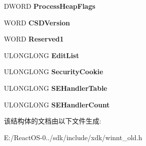 \begin{DoxyCompactItemize}
D\+W\+O\+RD {\bfseries Process\+Heap\+Flags}
\item 
\mbox{\label{struct___i_m_a_g_e___l_o_a_d___c_o_n_f_i_g___d_i_r_e_c_t_o_r_y64_ab2f2a1ae5634a9ab27dd1544e0cfab0a}} 
W\+O\+RD {\bfseries C\+S\+D\+Version}
\item 
\mbox{\label{struct___i_m_a_g_e___l_o_a_d___c_o_n_f_i_g___d_i_r_e_c_t_o_r_y64_a5f8e883e022c6456c50e85e4869b561d}} 
W\+O\+RD {\bfseries Reserved1}
\item 
\mbox{\label{struct___i_m_a_g_e___l_o_a_d___c_o_n_f_i_g___d_i_r_e_c_t_o_r_y64_aabdb79e093c3b752a6f121eebcfbf79e}} 
U\+L\+O\+N\+G\+L\+O\+NG {\bfseries Edit\+List}
\item 
\mbox{\label{struct___i_m_a_g_e___l_o_a_d___c_o_n_f_i_g___d_i_r_e_c_t_o_r_y64_af6728e60cbf4a1d734bd12d6b1585115}} 
U\+L\+O\+N\+G\+L\+O\+NG {\bfseries Security\+Cookie}
\item 
\mbox{\label{struct___i_m_a_g_e___l_o_a_d___c_o_n_f_i_g___d_i_r_e_c_t_o_r_y64_a5ab4a17df718998c22cb3a521fd15ba9}} 
U\+L\+O\+N\+G\+L\+O\+NG {\bfseries S\+E\+Handler\+Table}
\item 
\mbox{\label{struct___i_m_a_g_e___l_o_a_d___c_o_n_f_i_g___d_i_r_e_c_t_o_r_y64_a8bbbaf6612ac1e96310e816df684a1a2}} 
U\+L\+O\+N\+G\+L\+O\+NG {\bfseries S\+E\+Handler\+Count}
\end{DoxyCompactItemize}


该结构体的文档由以下文件生成\+:\begin{DoxyCompactItemize}
\item 
E\+:/\+React\+O\+S-\/0../sdk/include/xdk/winnt\+\_\+old.\+h\end{DoxyCompactItemize}
